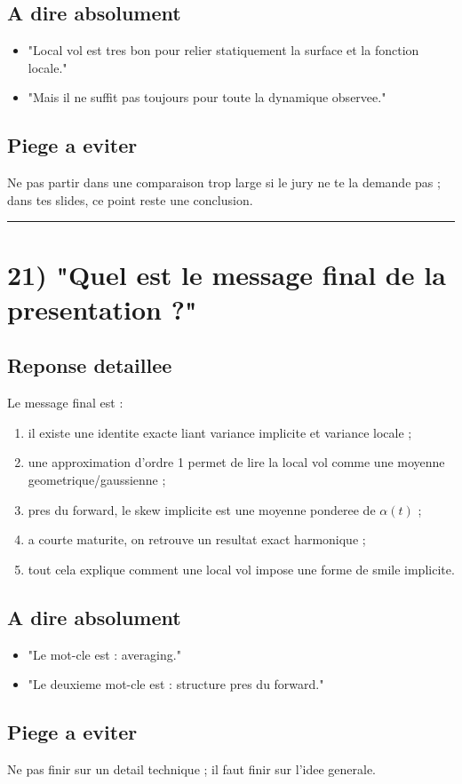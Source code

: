 \documentclass[11pt,a4paper]{article}
\begin{document}
\subsection{A dire absolument}

\begin{itemize}
\item "Local vol est tres bon pour relier statiquement la surface et la fonction locale."
\item "Mais il ne suffit pas toujours pour toute la dynamique observee."
\end{itemize}

\subsection{Piege a eviter}

Ne pas partir dans une comparaison trop large si le jury ne te la demande pas ; dans tes slides, ce point reste une conclusion.

\bigskip\hrule\bigskip

\section{21) "Quel est le message final de la presentation ?"}

\subsection{Reponse detaillee}

Le message final est :

\begin{enumerate}
\item il existe une identite exacte liant variance implicite et variance locale ;
\item une approximation d'ordre 1 permet de lire la local vol comme une moyenne geometrique/gaussienne ;
\item pres du forward, le skew implicite est une moyenne ponderee de \(\alpha(t)\) ;
\item a courte maturite, on retrouve un resultat exact harmonique ;
\item tout cela explique comment une local vol impose une forme de smile implicite.
\end{enumerate}

\subsection{A dire absolument}

\begin{itemize}
\item "Le mot-cle est : averaging."
\item "Le deuxieme mot-cle est : structure pres du forward."
\end{itemize}

\subsection{Piege a eviter}

Ne pas finir sur un detail technique ; il faut finir sur l'idee generale.
\end{document}
